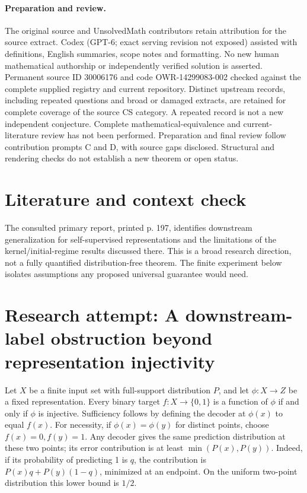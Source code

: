 \documentclass[11pt]{article}
\begin{document}
\paragraph{Preparation and review.}
The original source and UnsolvedMath contributors retain attribution for the source extract. Codex (GPT-6; exact serving revision not exposed) assisted with definitions, English summaries, scope notes and formatting. No new human mathematical authorship or independently verified solution is asserted. Permanent source ID 30006176 and code OWR-14299083-002 checked against the complete supplied registry and current repository. Distinct upstream records, including repeated questions and broad or damaged extracts, are retained for complete coverage of the source CS category. A repeated record is not a new independent conjecture. Complete mathematical-equivalence and current-literature review has not been performed. Preparation and final review follow contribution prompts C and D, with source gaps disclosed. Structural and rendering checks do not establish a new theorem or open status.
\label{end:30006176}

\section{Literature and context check}
The consulted primary report, printed p. 197, identifies downstream generalization for self-supervised representations and the limitations of the kernel/initial-regime results discussed there. This is a broad research direction, not a fully quantified distribution-free theorem. The finite experiment below isolates assumptions any proposed universal guarantee would need.
\section{Research attempt: A downstream-label obstruction beyond representation injectivity}

Let $X$ be a finite input set with full-support distribution $P$, and let $\phi:X\to Z$ be a fixed representation. Every binary target $f:X\to\{0,1\}$ is a function of $\phi$ if and only if $\phi$ is injective. Sufficiency follows by defining the decoder at $\phi(x)$ to equal $f(x)$. For necessity, if $\phi(x)=\phi(y)$ for distinct points, choose $f(x)=0,f(y)=1$. Any decoder gives the same prediction distribution at these two points; its error contribution is at least $\min(P(x),P(y))$. Indeed, if its probability of predicting 1 is $q$, the contribution is $P(x)q+P(y)(1-q)$, minimized at an endpoint. On the uniform two-point distribution this lower bound is $1/2$.
\end{document}
